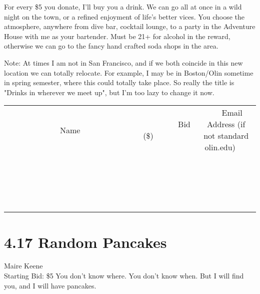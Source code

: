 \documentclass[11pt]{article}
\begin{document}
For every \$5 you donate, I'll buy you a drink. We can go all at once in a wild night on the town, or a refined enjoyment of life's better vices. You choose the atmosphere, anywhere from dive bar, cocktail lounge, to a party in the Adventure House with me as your bartender. Must be 21+ for alcohol in the reward, otherwise we can go to the fancy hand crafted soda shops in the area.

Note: At times I am not in San Francisco, and if we both coincide in this new location we can totally relocate. For example, I may be in Boston/Olin sometime in spring semester, where this could totally take place. So really the title is "Drinks in wherever we meet up", but I'm too lazy to change it now.
\\[3ex]
\begin{tabular}{c c c}
~~~~~~~~~~~~~Name~~~~~~~~~~~~~ & ~~~~~~~~~Bid (\$)~~~~~~~~~  & ~~~Email Address (if not standard olin.edu)~~~\\
 & & \\
\hline
 & & \\
\hline
 & & \\
\hline
 & & \\
\hline
 & & \\
\hline
 & & \\
\hline
 & & \\
\hline
 & & \\
\hline
 & & \\
\hline
 & & \\
\hline
 & & \\
\hline
 & & \\
\hline
 & & \\
\hline
 & & \\
\hline
 & & \\
\hline
 & & \\
\hline
 & & \\
\hline
 & & \\
\hline
 & & \\
\hline
\end{tabular}
\newpage
\section*{4.17 Random Pancakes}
Maire Keene
\\
Starting Bid: \$5
\newline
You don't know where.
You don't know when.
But I will find you,
and I will have pancakes.
\end{document}
